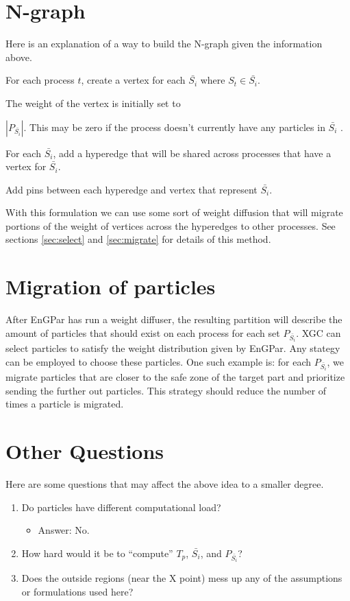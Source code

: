 \documentclass[a4paper]{article}
\begin{document}
\section{N-graph}
Here is an explanation of a way to build the N-graph given the information above.
\begin{enumerate}
  {\color{blue}
  \item For each process $t$, create a vertex for each $\bar{S_i}$ where $S_t \in \bar{S_i}$.
  }
\item The weight of the vertex is initially set to {\color{blue} $|P_{\bar{S_i}}|$. This may be zero if the process doesn't currently have any particles in $\bar{S_i}$ .
\item For each $\bar{S_i}$, add a hyperedge that will be shared across processes that have a vertex for $\bar{S_i}$.}
\item Add pins between each hyperedge and vertex that represent {\color{blue} $\bar{S_i}$.}
\end{enumerate}
With this formulation we can use some sort of weight diffusion that will
migrate portions of the weight of vertices across the hyperedges to other
processes. {\color{blue} See sections \ref{sec:select} and \ref{sec:migrate}
for details of this method.}
{
  \color{blue}
\section{Migration of particles}
After EnGPar has run a weight diffuser, the resulting partition will
describe the amount of particles that should exist on each process
for each set $P_{\bar{S_i}}$. XGC can select particles to satisfy the weight
distribution given by EnGPar. Any stategy can be employed to choose
these particles. One such example is: for each $P_{\bar{S_i}}$, we migrate particles
that are closer to the safe zone of the target part and prioritize sending
the further out particles. This strategy should reduce the number of times
a particle is migrated.
}
\section{Other Questions}
Here are some questions that may affect the above idea to a smaller degree.
\begin{enumerate}
\item Do particles have different computational load?
  {\color{red}
  \begin{itemize}
  \item Answer: No.
  \end{itemize}
  }
\item How hard would it be to ``compute'' $T_p$, $\bar{S_i}$, and $P_{\bar{S_i}}$?
\item Does the outside regions (near the X point) mess up any of the assumptions or formulations used here?
\end{enumerate}
\end{document}
